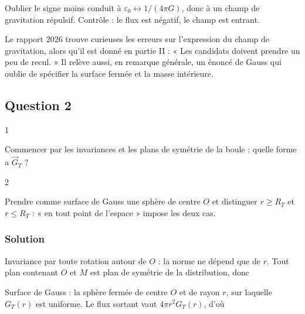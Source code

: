 \documentclass[11pt,a4paper]{article}
\newcommand{\equationajustee}[1]{%
  \sbox{\boiteequation}{$\displaystyle #1$}%
  \ifdim\wd\boiteequation>\linewidth
    \[\resizebox{\linewidth}{!}{\usebox{\boiteequation}}\]%
  \else
    \[#1\]%
  \fi}
\begin{document}
\begin{piege}

Oublier le signe moins conduit à \(\varepsilon_0\leftrightarrow1/(4\pi G)\), donc à un champ de gravitation répulsif. Contrôle : le flux est négatif, le champ est entrant.

\end{piege}

\begin{jury}

Le rapport 2026 trouve curieuses les erreurs sur l'expression du champ de gravitation, alors qu'il est donné en partie II : « Les candidats doivent prendre un peu de recul. » Il relève aussi, en remarque générale, un énoncé de Gauss qui oublie de spécifier la surface fermée et la masse intérieure.

\end{jury}

\hypertarget{question-2}{%
\subsection{Question 2}\label{question-2}}

\begin{indication}{1}

Commencer par les invariances et les plans de symétrie de la boule : quelle forme a \(\vec G_T\) ?

\end{indication}

\begin{indication}{2}

Prendre comme surface de Gauss une sphère de centre \(O\) et distinguer \(r\ge R_T\) et \(r\le R_T\) : « en tout point de l'espace » impose les deux cas.

\end{indication}

\hypertarget{solution-1}{%
\subsubsection{Solution}\label{solution-1}}

Invariance par toute rotation autour de \(O\) : la norme ne dépend que de \(r\). Tout plan contenant \(O\) et \(M\) est plan de symétrie de la distribution, donc

\equationajustee{\vec G_T(M)=G_T(r)\,\vec u_r .}

Surface de Gauss : la sphère fermée de centre \(O\) et de rayon \(r\), sur laquelle \(G_T(r)\) est uniforme. Le flux sortant vaut \(4\pi r^2G_T(r)\), d'où
\end{document}
